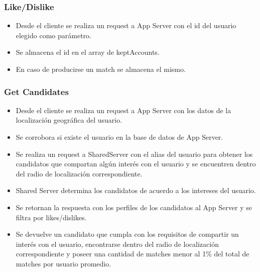 \documentclass[letterpaper,10pt,english]{sphinxmanual}
\begin{document}
\subsubsection{Like/Dislike}
\label{manuals:like-dislike}\begin{itemize}
\item {} 
Desde el cliente se realiza un request a App Server con el id del usuario elegido como parámetro.

\item {} 
Se almacena el id en el array de keptAccounts.

\item {} 
En caso de producirse un match se almacena el mismo.

\end{itemize}


\subsubsection{Get Candidates}
\label{manuals:get-candidates}\begin{itemize}
\item {} 
Desde el cliente se realiza un request a App Server con los datos de la localización geográfica del usuario.

\item {} 
Se corrobora si existe el usuario en la base de datos de App Server.

\item {} 
Se realiza un request a SharedServer con el alias del usuario para obtener los candidatos que compartan algún interés con el usuario y se encuentren dentro del radio de localización correspondiente.

\item {} 
Shared Server determina los candidatos de acuerdo a los intereses del usuario.

\item {} 
Se retornan la respuesta con los perfiles de los candidatos al App Server y se filtra por likes/dislikes.

\item {} 
Se devuelve un candidato que cumpla con los requisitos de compartir un interés con el usuario, encontrarse dentro del radio de localización correspondiente y poseer una cantidad de matches menor al 1\% del total de matches por usuario promedio.

\end{itemize}
\end{document}
